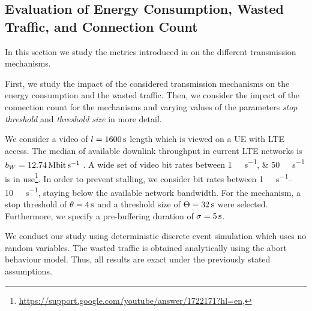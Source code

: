 \subsection{Evaluation of Energy Consumption, Wasted Traffic, and Connection Count}\label{sec:application:lte_video:numerical_evaluation}

In this section we study the metrics introduced in  on the different transmission mechanisms.

First, we study the impact of the considered transmission mechanisms on the energy consumption and the wasted traffic. 
Then, we consider the impact of the connection count for the \streaming mechanisms and varying values of the parameters \emph{stop threshold} \bufferlower and \emph{threshold size} \buffersize in more detail.

We consider a video of \(l=\SI{1600}{\second}\) length which is viewed on a \gls{UE} with \gls{LTE} access.
The median of available downlink throughput in current \gls{LTE} networks is \(\bandwidth = \SI{12.74}{\mega\bit\per\second}\) \cite{Huang2012}.
A wide set of video bit rates between \SIlist{1;50}{\mega\bit\per\second} is in use\footnote{\url{https://support.google.com/youtube/answer/1722171?hl=en}, \accessed}.
In order to prevent stalling, we consider bit rates between \SIrange{1}{10}{\mega\bit\per\second}, staying below the available network bandwidth.
For the \streaming mechanism, a stop threshold of \(\theta = \SI{4}{\second}\) and a threshold size of \(\Theta = \SI{32}{\second}\) were selected.
Furthermore, we specify a pre-buffering duration of \(\sigma = \SI{5}{\second}\).

We conduct our study using deterministic discrete event simulation which uses no random variables.
The wasted traffic is obtained analytically using the abort behaviour model.
Thus, all results are exact under the previously stated assumptions.

